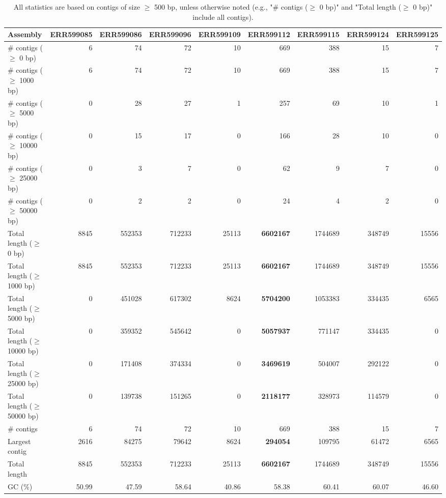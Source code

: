 \documentclass[12pt,a4paper]{article}
\begin{document}
\begin{table}[ht]
\begin{center}
\caption{All statistics are based on contigs of size $\geq$ 500 bp, unless otherwise noted (e.g., "\# contigs ($\geq$ 0 bp)" and "Total length ($\geq$ 0 bp)" include all contigs).}
\begin{tabular}{|l*{8}{|r}|}
\hline
Assembly & ERR599085 & ERR599086 & ERR599096 & ERR599109 & ERR599112 & ERR599115 & ERR599124 & ERR599125 \\ \hline
\# contigs ($\geq$ 0 bp) & 6 & 74 & 72 & 10 & 669 & 388 & 15 & 7 \\ \hline
\# contigs ($\geq$ 1000 bp) & 6 & 74 & 72 & 10 & 669 & 388 & 15 & 7 \\ \hline
\# contigs ($\geq$ 5000 bp) & 0 & 28 & 27 & 1 & 257 & 69 & 10 & 1 \\ \hline
\# contigs ($\geq$ 10000 bp) & 0 & 15 & 17 & 0 & 166 & 28 & 10 & 0 \\ \hline
\# contigs ($\geq$ 25000 bp) & 0 & 3 & 7 & 0 & 62 & 9 & 7 & 0 \\ \hline
\# contigs ($\geq$ 50000 bp) & 0 & 2 & 2 & 0 & 24 & 4 & 2 & 0 \\ \hline
Total length ($\geq$ 0 bp) & 8845 & 552353 & 712233 & 25113 & {\bf 6602167} & 1744689 & 348749 & 15556 \\ \hline
Total length ($\geq$ 1000 bp) & 8845 & 552353 & 712233 & 25113 & {\bf 6602167} & 1744689 & 348749 & 15556 \\ \hline
Total length ($\geq$ 5000 bp) & 0 & 451028 & 617302 & 8624 & {\bf 5704200} & 1053383 & 334435 & 6565 \\ \hline
Total length ($\geq$ 10000 bp) & 0 & 359352 & 545642 & 0 & {\bf 5057937} & 771147 & 334435 & 0 \\ \hline
Total length ($\geq$ 25000 bp) & 0 & 171408 & 374334 & 0 & {\bf 3469619} & 504007 & 292122 & 0 \\ \hline
Total length ($\geq$ 50000 bp) & 0 & 139738 & 151265 & 0 & {\bf 2118177} & 328973 & 114579 & 0 \\ \hline
\# contigs & 6 & 74 & 72 & 10 & 669 & 388 & 15 & 7 \\ \hline
Largest contig & 2616 & 84275 & 79642 & 8624 & {\bf 294054} & 109795 & 61472 & 6565 \\ \hline
Total length & 8845 & 552353 & 712233 & 25113 & {\bf 6602167} & 1744689 & 348749 & 15556 \\ \hline
GC (\%) & 50.99 & 47.59 & 58.64 & 40.86 & 58.38 & 60.41 & 60.07 & 46.60 \\ \hline

\end{tabular}
\end{center}
\end{table}
\end{document}
